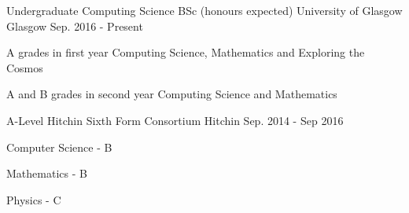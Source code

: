 

\begin{cventries}

  \cventry
    {Undergraduate Computing Science BSc (honours expected)} %
    {University of Glasgow} %
    {Glasgow} %
    {Sep. 2016 - Present} %
    {
      \begin{cvitems} %
        \item {A grades in first year Computing Science, Mathematics and Exploring the Cosmos}
        \item {A and B grades in second year Computing Science and Mathematics}
      \end{cvitems}
    }
  \cventry
    {A-Level}
    {Hitchin Sixth Form Consortium}
    {Hitchin}
    {Sep. 2014 - Sep 2016}
    {
      \begin{cvitems}
        \item{Computer Science - B}
	\item{Mathematics - B}
	\item{Physics - C}
      \end{cvitems}
    }
\end{cventries}
